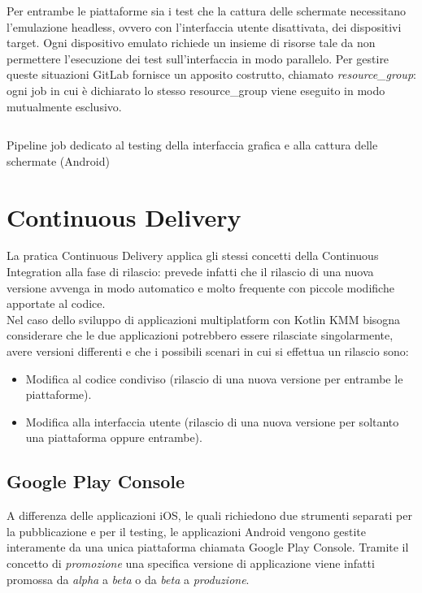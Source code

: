Per entrambe le piattaforme sia i test che la cattura delle schermate necessitano l'emulazione headless, ovvero con l'interfaccia utente disattivata, dei dispositivi target. Ogni dispositivo emulato richiede un insieme di risorse tale da non permettere l'esecuzione dei test sull'interfaccia in modo parallelo. Per gestire queste situazioni GitLab fornisce un apposito costrutto, chiamato \textit{resource\_group}: ogni job in cui è dichiarato lo stesso resource\_group viene eseguito in modo mutualmente esclusivo.

\begin{listing}[H]
\inputminted{yaml}{code/4-screenshot-ui-android}
\caption{Pipeline job dedicato al testing della interfaccia grafica e alla cattura delle schermate (Android)}
\end{listing}

\section{Continuous Delivery}
La pratica Continuous Delivery applica gli stessi concetti della Continuous Integration alla fase di rilascio: prevede infatti che il rilascio di una nuova versione avvenga in modo automatico e molto frequente con piccole modifiche apportate al codice.\\
Nel caso dello sviluppo di applicazioni multiplatform con Kotlin KMM bisogna considerare che le due applicazioni potrebbero essere rilasciate singolarmente, avere versioni differenti e che i possibili scenari in cui si effettua un rilascio sono:
\begin{itemize}
    \item Modifica al codice condiviso (rilascio di una nuova versione per entrambe le piattaforme).
    \item Modifica alla interfaccia utente (rilascio di una nuova versione per soltanto una piattaforma oppure entrambe).
\end{itemize}

\subsection{Google Play Console}
A differenza delle applicazioni iOS, le quali richiedono due strumenti separati per la pubblicazione e per il testing, le applicazioni Android vengono gestite interamente da una unica piattaforma chiamata Google Play Console. Tramite il concetto di \textit{promozione} una specifica versione di applicazione viene infatti promossa da \textit{alpha} a \textit{beta} o da \textit{beta} a \textit{produzione}.

